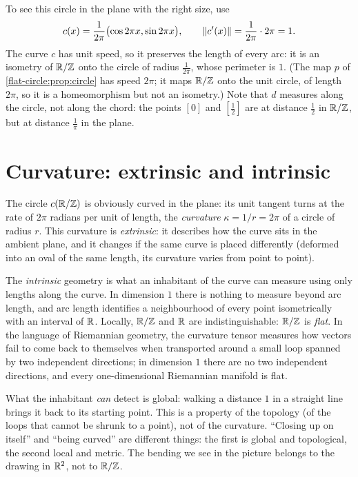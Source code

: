 \begin{notechapter}
To see this circle in the plane with the right size, use
\[
  c(x) = \frac1{2\pi}\bigl(\cos 2\pi x, \sin 2\pi x\bigr),\qquad \left\|c'(x)\right\| = \frac1{2\pi}\cdot2\pi = 1 .
\]
The curve $c$ has unit speed, so it preserves the length of every arc: it is an isometry of $\mathbb{R}/\mathbb{Z}$ onto
the circle of radius $\frac1{2\pi}$, whose perimeter is $1$. (The map $p$ of
\cref{flat-circle:prop:circle} has speed $2\pi$; it maps $\mathbb{R}/\mathbb{Z}$ onto the unit circle, of length $2\pi$, so it is
a homeomorphism but not an isometry.) Note that $d$ measures along the circle, not along the chord:
the points $[0]$ and $[\frac12]$ are at distance $\frac12$ in $\mathbb{R}/\mathbb{Z}$, but at distance $\frac1\pi$ in the plane.

\section{Curvature: extrinsic and intrinsic}

The circle $c(\mathbb{R}/\mathbb{Z})$ is obviously curved in the plane: its unit tangent turns at the rate of $2\pi$ radians
per unit of length, the \emph{curvature} $\kappa = 1/r = 2\pi$ of a circle of radius $r$. This curvature is
\emph{extrinsic}: it describes how the curve sits in the ambient plane, and it changes if the same
curve is placed differently (deformed into an oval of the same length, its curvature varies from
point to point).

The \emph{intrinsic} geometry is what an inhabitant of the curve can measure using only lengths
along the curve. In dimension $1$ there is nothing to measure beyond arc length, and arc length
identifies a neighbourhood of every point isometrically with an interval of $\mathbb{R}$. Locally, $\mathbb{R}/\mathbb{Z}$ and $\mathbb{R}$
are indistinguishable: $\mathbb{R}/\mathbb{Z}$ is \emph{flat}. In the language of Riemannian geometry, the curvature tensor
measures how vectors fail to come back to themselves when transported around a small loop
spanned by two independent directions; in dimension $1$ there are no two independent directions,
and every one-dimensional Riemannian manifold is flat.

What the inhabitant \emph{can} detect is global: walking a distance $1$ in a straight line brings it back
to its starting point. This is a property of the topology (of the loops that cannot be shrunk to a
point), not of the curvature. ``Closing up on itself'' and ``being curved'' are different things: the
first is global and topological, the second local and metric. The bending we see in the picture
belongs to the drawing in $\mathbb{R}^2$, not to $\mathbb{R}/\mathbb{Z}$.


\end{notechapter}
